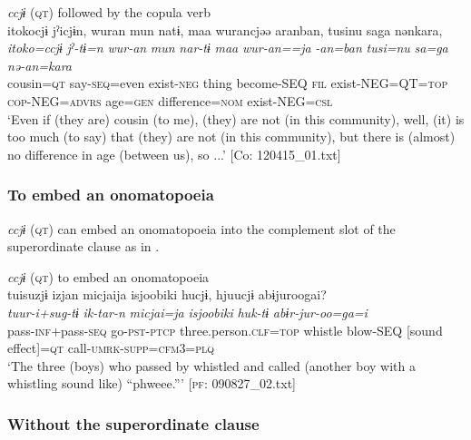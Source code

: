   \ex \textit{ccjɨ} (\textsc{qt}) followed by the copula verb\\
      \glll    {\textbar}itoko{\textbar}cjɨ  jˀicjɨn,  wuran  mun  natɨ,  {\textbar}maa{\textbar}   wurancjəə  aranban,  tusinu  {\textbar}sa{\textbar}ga  nənkara,\\
    \textit{itoko=ccjɨ}  \textit{jˀ-tɨ=n}  \textit{wur-an}  \textit{mun}  \textit{nar-tɨ}  \textit{maa} \textit{wur-an==ja}  \textit{-an=ban}  \textit{tusi=nu}  \textit{sa=ga}  \textit{nə-an=kara}\\
    cousin=\textsc{qt}  say-\textsc{seq}=even  exist-\textsc{neg}  thing  become-SEQ  \textsc{fil} exist-NEG=QT=\textsc{top}  \textsc{cop}-NEG=\textsc{advrs}  age=\textsc{gen}  difference=\textsc{nom}  exist-NEG=\textsc{csl}\\
\glt     ‘Even if (they are) cousin (to me), (they) are not (in this community), well, (it) is too much (to say) that (they) are not (in this community), but there is (almost) no difference in age (between us), so ...’  [Co: 120415\_01.txt]
\z
\z

\subsubsection{To embed an onomatopoeia}\label{sec:10.4.1.6}

\textit{ccjɨ} (\textsc{qt}) can embed an onomatopoeia into the complement slot of the superordinate clause as in .

\ea\label{ex:10.73}   \textit{ccjɨ} (\textsc{qt}) to embed an onomatopoeia\\
      \glll    tuisuzjɨ  izjan  micjaija  isjoobiki  hucjɨ,  hjuucjɨ  abɨjuroogai?\\
    \textit{tuur-i+sug-tɨ}  \textit{ik-tar-n}  \textit{micjai=ja}  \textit{isjoobiki}  \textit{huk-tɨ}  \textit{}  \textit{abɨr-jur-oo=ga=i}\\
    pass-\textsc{inf}+pass-\textsc{seq}  go-\textsc{pst}-\textsc{ptcp}  three.person.\textsc{clf}=\textsc{top}  whistle  blow-SEQ  [sound effect]=\textsc{qt}  call-\textsc{umrk}-\textsc{supp}=\textsc{cfm}3=\textsc{plq}\\
    \glt     ‘The three (boys) who passed by whistled and called (another boy with a whistling sound like) “phweee.”’ [\textsc{pf}: 090827\_02.txt]
    \z

\subsubsection{Without the superordinate clause}\label{sec:10.4.1.7}

